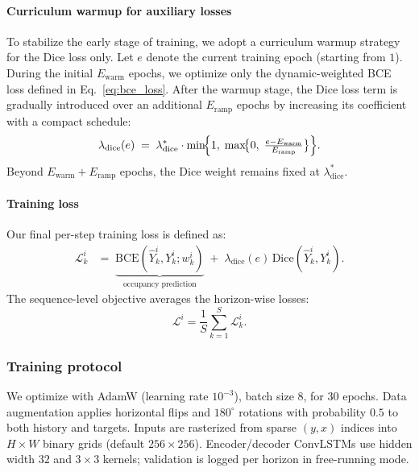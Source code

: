 \paragraph{Curriculum warmup for auxiliary losses}  
To stabilize the early stage of training, we adopt a curriculum warmup strategy for the Dice loss only. Let $e$ denote the current training epoch (starting from $1$). During the initial $E_{\mathrm{warm}}$ epochs, we optimize only the dynamic-weighted BCE loss defined in Eq.~\eqref{eq:bce_loss}. After the warmup stage, the Dice loss term is gradually introduced over an additional $E_{\mathrm{ramp}}$ epochs by increasing its coefficient with a compact schedule:
\[
\lambda_{\mathrm{dice}}(e) \;=\; \lambda_{\mathrm{dice}}^\ast \cdot \min\!\Bigl\{1,\;\max\!\bigl\{0,\;\tfrac{e-E_{\mathrm{warm}}}{E_{\mathrm{ramp}}}\bigr\}\Bigr\}.
\]
Beyond $E_{\mathrm{warm}} + E_{\mathrm{ramp}}$ epochs, the Dice weight remains fixed at $\lambda_{\mathrm{dice}}^\ast$.

\paragraph{Training loss}
Our final per-step training loss is defined as:
\begin{align}
\mathcal{L}^i_k
&=\;
\underbrace{\mathrm{BCE}\!\left(\widehat{Y}^i_k, Y^i_k; w^i_k\right)}_{\text{occupancy prediction}}
\;+\;
\lambda_{\mathrm{dice}}(e)\,
\mathrm{Dice}\!\left(\widehat{Y}^i_k, Y^i_k\right).
\label{eq:final_loss}
\end{align}
The sequence-level objective averages the horizon-wise losses:
\[
\mathcal{L}^i = \frac{1}{S}\sum_{k=1}^{S}\mathcal{L}^i_k.
\]

\subsubsection{Training protocol}
We optimize with AdamW (learning rate $10^{-3}$), batch size $8$, for $30$ epochs. Data augmentation applies horizontal flips and $180^\circ$ rotations with probability $0.5$ to both history and targets. Inputs are rasterized from sparse $(y,x)$ indices into $H{\times}W$ binary grids (default $256{\times}256$). Encoder/decoder ConvLSTMs use hidden width $32$ and $3{\times}3$ kernels; validation is logged per horizon in free-running mode.






